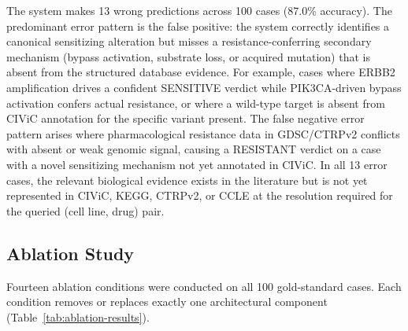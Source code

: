 \documentclass{article}
\begin{document}
The system makes 13 wrong predictions across 100 cases (87.0\% accuracy). The predominant error pattern is the false positive: the system correctly identifies a canonical sensitizing alteration but misses a resistance-conferring secondary mechanism (bypass activation, substrate loss, or acquired mutation) that is absent from the structured database evidence. For example, cases where ERBB2 amplification drives a confident SENSITIVE verdict while PIK3CA-driven bypass activation confers actual resistance, or where a wild-type target is absent from CIViC annotation for the specific variant present. The false negative error pattern arises where pharmacological resistance data in GDSC/CTRPv2 conflicts with absent or weak genomic signal, causing a RESISTANT verdict on a case with a novel sensitizing mechanism not yet annotated in CIViC. In all 13 error cases, the relevant biological evidence exists in the literature but is not yet represented in CIViC, KEGG, CTRPv2, or CCLE at the resolution required for the queried (cell line, drug) pair.

\subsection{Ablation Study}

Fourteen ablation conditions were conducted on all 100 gold-standard cases. Each condition removes or replaces exactly one architectural component (Table~\ref{tab:ablation-results}).
\end{document}
